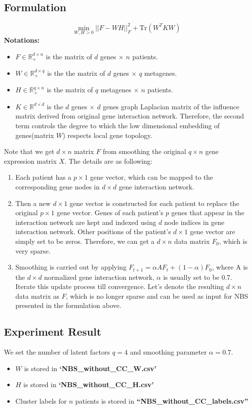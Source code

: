 \documentclass[11pt]{article}
\newcommand{\Tr}{\mathrm{Tr}}
\begin{document}
\subsection{Formulation\label{nbs_single}}
\begin{equation}
\underset{W,H>0}\min ||F-WH||_F^2+\Tr(W^TKW)
\end{equation}
\textbf{Notations:}
\begin{itemize}
	\item{$F\in \mathbb{R}_+^{d\times n}$ is the matrix of $d$ genes $\times$ $n$ patients.}
	\item{$W\in\mathbb{R}_+^{d\times q}$ is the the matrix of $d$ genes $\times$ $q$ metagenes.}
	\item{$H\in\mathbb{R}_+^{q\times n}$ is the matrix of $q$ metagenes $\times$ $n$ patients.}
	\item{$K\in\mathbb{R}^{d\times d}$ is the $d$ genes $\times$ $d$ genes graph Laplacian matrix of the influence matrix derived from original gene interaction network. Therefore, the second term controls the degree to which the low dimensional embedding of genes(matrix $W$) respects local gene topology.}
\end{itemize}
Note that we get $d\times n$ matrix $F$ from smoothing the original $q\times n$ gene expression matrix $X$. The details are as following:
\begin{enumerate}
	\item{Each patient has a $p\times 1$ gene vector, which can be mapped to the corresponding gene nodes in $d\times d$ gene interaction network.}
	\item{Then a new $d\times 1$ gene vector is constructed for each patient to replace the original $p\times 1$ gene vector. Genes of each patient's $p$ genes that appear in the interaction network are kept and indexed using $d$ node indices in gene interaction network. Other positions of the patient's $d\times 1$ gene vector are simply set to be zeros. Therefore, we can get a $d\times n$ data matrix $F_0$, which is very sparse.}
	\item{Smoothing \cite{prop}\cite{zhou} is carried out by applying $F_{t+1} = \alpha AF_t +(1-\alpha)F_0$, where A is the $d\times d$ normalized gene interaction network, $\alpha$ is usually set to be 0.7. Iterate this update process till convergence. Let's denote the resulting $d\times n$ data matrix as $F$, which is no longer sparse and can be used as input for NBS presented in the formulation above.}
\end{enumerate} 
\subsection{Experiment Result}
We set the number of latent factors $q=4$ and smoothing parameter $\alpha=0.7$.\\
\begin{itemize}
	\item{$W$ is stored in \textbf{`NBS\_without\_CC\_W.csv'}}
	\item{$H$ is stored in \textbf{`NBS\_without\_CC\_H.csv'}}
	\item{Cluster labels for $n$ patients is stored in \textbf{``NBS\_without\_CC\_labels.csv''}}
\end{itemize}
\end{document}
